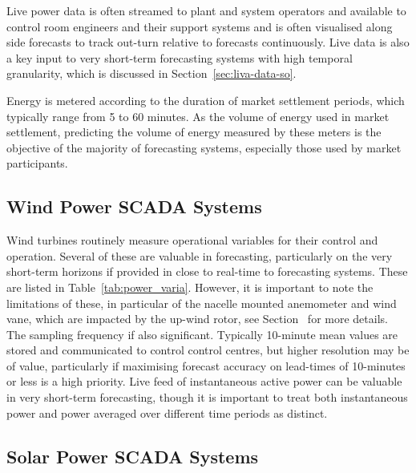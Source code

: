 Live power data is often streamed to plant and system operators and  available to control room engineers and their support systems and is often visualised along side forecasts to track out-turn relative to forecasts continuously. Live data is also a key input to very short-term forecasting systems with high temporal granularity, which is discussed in Section~\ref{sec:liva-data-so}. 

Energy is metered according to the duration of market settlement periods, which typically range from 5 to 60 minutes. As the volume of energy used in market settlement, predicting the volume of energy measured by these meters is the objective of the majority of forecasting systems, especially those used by market participants.

\subsection{Wind Power SCADA Systems }\label{subsec:scadasolar}
{\color{magenta}{Contributing author: JB}}{\color{blue}{ -- needs attention - more authors ? COM: 23.08.2021 still valid ?}}

Wind turbines routinely measure operational variables for their control and operation. Several of these are valuable in forecasting, particularly on the very short-term horizons if provided in close to real-time to forecasting systems. These are listed in Table~\ref{tab:power_varia}. However, it is important to note the limitations of these, in particular of the nacelle mounted anemometer and wind vane, which are impacted by the up-wind rotor, see Section~{\color{magenta}{cross-ref}} for more details. The sampling frequency if also significant. Typically 10-minute mean values are stored and communicated to control control centres, but higher resolution may be of value, particularly if maximising forecast accuracy on lead-times of 10-minutes or less is a high priority. Live feed of instantaneous active power can be valuable in very short-term forecasting, though it is important to treat both instantaneous power and power averaged over different time periods as distinct.


\subsection{Solar Power SCADA Systems {\color{magenta}{Contributing author: ?}}}\label{subsec:scadawind}

{\color{magenta}{JB has reached out to members of IEA PVPS 16 and Justin Sharp for input. Rui also offered to speak to contact and contribute here.}}

